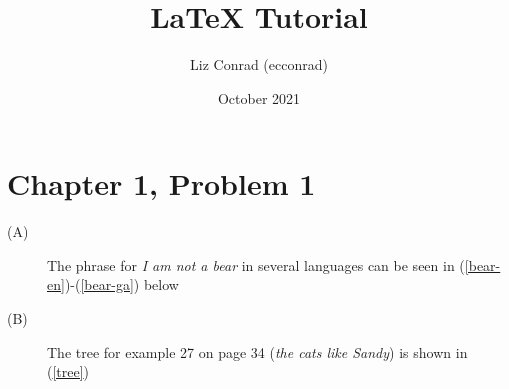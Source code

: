 \documentclass{article}
\title{LaTeX Tutorial}
\author{Liz Conrad (ecconrad)}
\date{October 2021}
\begin{document}
\maketitle


\section*{Chapter 1, Problem 1}

\begin{description}
    
    \item[(A)] The phrase for \textit{I am not a bear} in several languages can be seen in (\ref{bear-en})-(\ref{bear-ga}) below
    
    
    \item[(B)] The tree for example 27 on page 34 (\textit{the cats like Sandy}) is shown in (\ref{tree})
    
    

\end{description}
\end{document}
